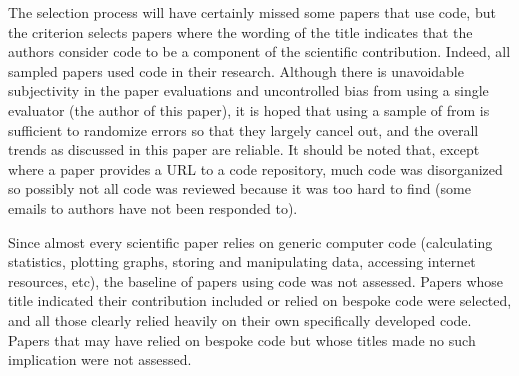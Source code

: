 \documentclass[10pt,a4paper]{article}
\begin{document}
The selection process will have certainly missed some papers that use code, but the criterion selects papers where the wording of the title indicates that the authors consider code to be a component of the scientific contribution. Indeed, all sampled papers used code in their research. Although there is unavoidable subjectivity in the paper evaluations and uncontrolled bias from using a single evaluator (the author of this paper), it is hoped that using a sample of  from  is sufficient to randomize errors so that they largely cancel out, and the overall trends as discussed in this paper are reliable. It should be noted that, except where a paper provides a URL to a code repository, much code was disorganized so possibly not all code was reviewed because it was too hard to find (some emails to authors have not been responded to). 
 
Since almost every scientific paper relies on generic computer code (calculating statistics, plotting graphs, storing and manipulating data, accessing internet resources, etc), the baseline of papers using code was not assessed. Papers whose title indicated their contribution included or relied on bespoke code were selected, and all those clearly relied heavily on their own specifically developed code. Papers that may have relied on bespoke code but whose titles made no such implication were not assessed.
\end{document}
